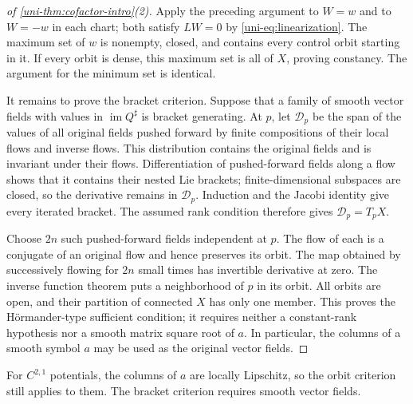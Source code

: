 \begin{proof}[of \cref{uni-thm:cofactor-intro}(2)]
Apply the preceding argument to $W=w$ and to $W=-w$ in each chart;
both satisfy $LW=0$ by \eqref{uni-eq:linearization}.  The maximum set of $w$ is nonempty,
closed, and contains every control orbit starting in it.  If every orbit is dense,
this maximum set is all of $X$, proving constancy.  The argument for the
minimum set is identical.

It remains to prove the bracket criterion. Suppose that a family of smooth vector fields with values in $\operatorname{im}Q^\sharp$ is bracket
generating.  At $p$, let $\mathcal D_p$ be the span of the values of
all original fields pushed forward by finite compositions of their local
flows and inverse flows.  This distribution contains the original fields
and is invariant under their flows.  Differentiation of pushed-forward
fields along a flow shows that it contains their nested Lie brackets;
finite-dimensional subspaces are closed, so the derivative remains in
$\mathcal D_p$.  Induction and the Jacobi identity give every iterated
bracket.  The assumed rank condition therefore gives
$\mathcal D_p=T_pX$.

Choose $2n$ such pushed-forward fields independent at $p$.  The flow
of each is a conjugate of an original flow and hence preserves its orbit.
The map obtained by successively flowing for $2n$ small times has
invertible derivative at zero.  The inverse function theorem puts a
neighborhood of $p$ in its orbit.  All orbits are open, and their
partition of connected $X$ has only one member.  This proves the
H\"ormander-type sufficient condition; it requires neither a constant-rank hypothesis
nor a smooth matrix square root of $a$.  In particular, the columns of a smooth
symbol $a$ may be used as the original vector fields.
\end{proof}

For $C^{2,1}$ potentials, the columns of $a$ are locally Lipschitz, so the orbit criterion still applies to them. The bracket criterion requires smooth vector fields.
